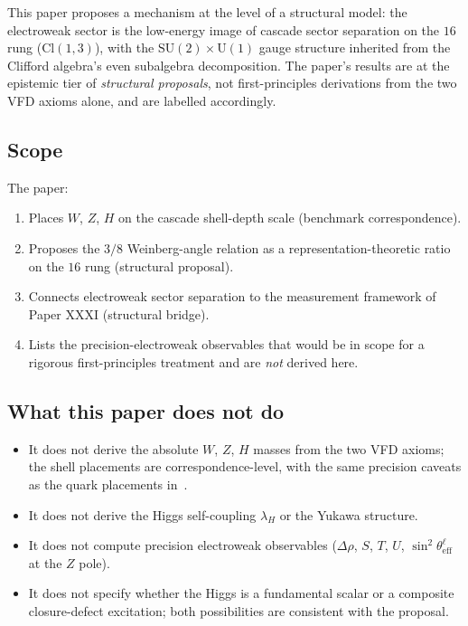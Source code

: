 \documentclass[12pt]{article}
\theoremstyle{definition}
\theoremstyle{remark}
\begin{document}
This paper proposes a mechanism at the level of a structural model: the electroweak sector is the low-energy image of cascade sector separation on the $16$ rung ($\mathrm{Cl}(1,3)$), with the $\mathrm{SU}(2) \times \mathrm{U}(1)$ gauge structure inherited from the Clifford algebra's even subalgebra decomposition. The paper's results are at the epistemic tier of \emph{structural proposals}, not first-principles derivations from the two VFD axioms alone, and are labelled accordingly.

\subsection{Scope}

The paper:
\begin{enumerate}
\item Places $W$, $Z$, $H$ on the cascade shell-depth scale (benchmark correspondence).
\item Proposes the $3/8$ Weinberg-angle relation as a representation-theoretic ratio on the $16$ rung (structural proposal).
\item Connects electroweak sector separation to the measurement framework of Paper XXXI (structural bridge).
\item Lists the precision-electroweak observables that would be in scope for a rigorous first-principles treatment and are \emph{not} derived here.
\end{enumerate}

\subsection{What this paper does not do}

\begin{itemize}
\item It does not derive the absolute $W$, $Z$, $H$ masses from the two VFD axioms; the shell placements are correspondence-level, with the same precision caveats as the quark placements in~\citep{SmartXXXVIII}.
\item It does not derive the Higgs self-coupling $\lambda_H$ or the Yukawa structure.
\item It does not compute precision electroweak observables ($\Delta \rho$, $S$, $T$, $U$, $\sin^2 \theta_{\mathrm{eff}}^\ell$ at the $Z$ pole).
\item It does not specify whether the Higgs is a fundamental scalar or a composite closure-defect excitation; both possibilities are consistent with the proposal.
\end{itemize}
\end{document}
